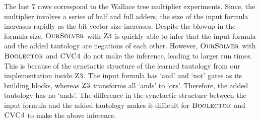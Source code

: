 The last 7 rows correspond to the Wallace tree multiplier experiments. Since, the multiplier involves a series of half and full adders, the size of the input formula increases rapidly as the bit vector size increases. Despite the blowup in the formula size, $\textsc{OurSolver}$ with $\textsc{Z3}$ is quickly able to infer that the input formula and the added tautology are negations of each other. However, $\textsc{OurSolver}$ with $\textsc{Boolector}$ and $\textsc{CVC4}$ do not make the inference, leading to larger run times. This is because of the synctactic structure of the learned tautology from our implementation inside $\textsc{Z3}$. The input formula has `and' and `not' gates as its building blocks, whereas $\textsc{Z3}$ transforms all `ands' to `ors'. Therefore, the added tautology has no `ands'. The difference in the synctactic structure between the input formula and the added tautology makes it difficult for $\textsc{Boolector}$ and $\textsc{CVC4}$ to make the above inference. 


%








